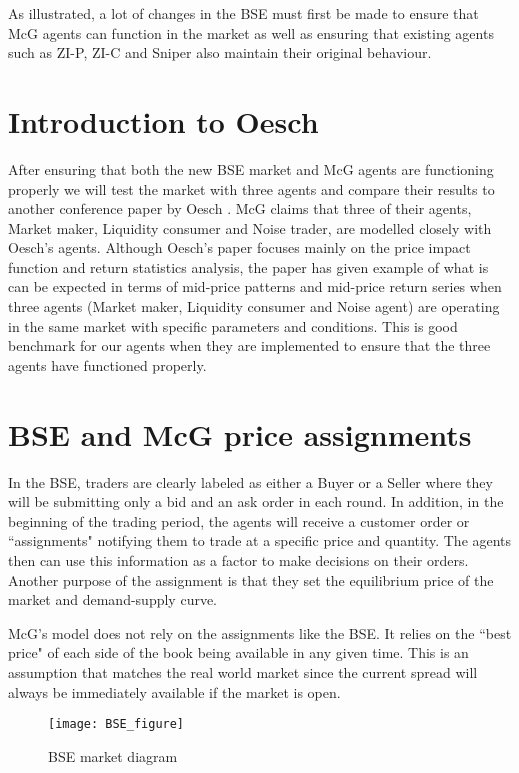 As illustrated, a lot of changes in the BSE must first be made to ensure that McG agents can function in the market as well as ensuring that existing agents such as ZI-P, ZI-C and Sniper also maintain their original behaviour.

\section{Introduction to Oesch}
After ensuring that both the new BSE market and McG agents are functioning properly we will test the market with three agents and compare their results to another conference paper by Oesch \cite{Oesch}. McG claims that three of their agents, Market maker, Liquidity consumer and Noise trader, are modelled closely with Oesch's agents. Although Oesch's paper focuses mainly on the price impact function and return statistics analysis, the paper has given example of what is can be expected in terms of mid-price patterns and mid-price return series when three agents (Market maker, Liquidity consumer and Noise agent) are operating in the same market with specific parameters and conditions. This is good benchmark for our agents when they are implemented to ensure that the three agents have functioned properly. 

\section{BSE and McG price assignments}
In the BSE, traders are clearly labeled as either a Buyer or a Seller where they will be submitting only a bid and an ask order in each round. In addition, in the beginning of the trading period, the agents will receive a customer order or ``assignments" notifying them to trade at a specific price and quantity. The agents then can use this information as a factor to make decisions on their orders. Another purpose of the assignment is that they set the equilibrium price of the market and demand-supply curve. 

McG's model does not rely on the assignments like the BSE. It relies on the ``best price" of each side of the book being available in any given time. This is an assumption that matches the real world market since the current spread will always be immediately available if the market is open. 

\begin{figure}[h]
\texttt{[image: BSE\_figure]}
\caption{BSE market diagram} 
\end{figure}
\FloatBarrier

